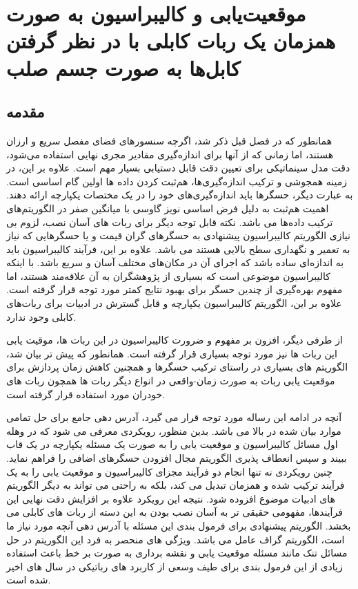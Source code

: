 \chapter{موقعیت‌یابی و کالیبراسیون به صورت همزمان یک ربات کابلی با در نظر گرفتن کابل‌ها به صورت جسم صلب}

\section{مقدمه}
همانطور که در فصل قبل ذکر شد، اگرچه سنسورهای فضای مفصل سریع و ارزان هستند، اما زمانی که از آنها برای اندازه‌گیری مقادیر مجری نهایی استفاده می‌شود، دقت مدل  سینماتیکی برای تعیین دقت قابل دستیابی بسیار مهم است. 
علاوه بر این، در زمینه همجوشی و ترکیب اندازه‌گیری‌ها، هم‌ثبت کردن داده ها \cite{hall1997introduction} اولین گام اساسی است. به عبارت دیگر، حسگرها باید اندازه‌گیری‌های خود را در یک مختصات یکپارچه ارائه دهند. اهمیت هم‌ثبت به دلیل فرض اساسی نویز گاوسی با میانگین صفر در الگوریتم‌های ترکیب داده‌ها می باشد. 
نکته قابل توجه دیگر برای ربات های آسان نصب، لزوم بی نیازی الگوریتم کالیبراسیون پیشنهادی به حسگرهای گران  قیمت و یا حسگرهایی که نیاز به تعمیر و نگهداری سطح بالایی هستند می باشد. علاوه بر این، فرآیند کالیبراسیون باید به اندازه‌ای ساده باشد که اجرای آن در مکان‌های مختلف آسان و سریع باشد.  
با اینکه کالیبراسیون موضوعی است که بسیاری از پژوهشگران به آن علاقه‌مند هستند، اما مفهوم بهره‌گیری از چندین حسگر برای بهبود نتایج کمتر مورد توجه قرار گرفته است. علاوه بر این، الگوریتم کالیبراسیون یکپارچه و قابل گسترش در ادبیات برای ربات‌های کابلی وجود ندارد. 

از طرفی دیگر، افزون بر مفهوم و ضرورت کالیبراسیون در این ربات ها، موقیت یابی این ربات ها نیز مورد توجه بسیاری قرار گرفته است. 
همانطور که پیش تر بیان شد، الگوریتم های بسیاری در راستای ترکیب حسگرها و همچنین کاهش زمان پردازش برای موقعیت یابی ربات به صورت زمان-واقعی در انواع دیگر ربات ها همچون ربات های خودران مورد استفاده قرار گرفته است. 

آنچه در ادامه این رساله مورد توجه قرار می گیرد، آدرس دهی جامع برای حل تمامی موارد بیان شده در بالا می باشد. بدین منظور، رویکردی معرفی می شود که در وهله اول مسائل کالیبراسیون و موقعیت یابی را به صورت یک مسئله یکپارچه در یک قاب ببیند و سپس انعطاف پذیری الگوریتم مجال افزودن حسگرهای اضافی را فراهم نماید. چنین رویکردی نه تنها انجام دو فرآیند مجزای کالیبراسیون و موقعیت یابی را به یک فرآیند ترکیب شده و همزمان تبدیل می کند، بلکه به راحتی می تواند به دیگر الگوریتم های ادبیات موضوع افزوده شود. نتیجه این رویکرد علاوه بر افزایش دقت نهایی این فرآیندها، مفهومی حقیقی تر به آسان نصب بودن به این دسته از ربات های کابلی می بخشد. الگوریتم پیشنهادی برای فرمول بندی این مسئله با آدرس دهی آنچه مورد نیاز ما است، الگوریتم گراف عامل می باشد. ویژگی های منحصر به فرد این الگوریتم در حل مسائل تنک مانند مسئله موقعیت یابی و نقشه برداری به صورت بر خط باعث استفاده زیادی از این فرمول بندی برای طیف وسعی از کاربرد های رباتیکی در سال های اخیر شده است.

